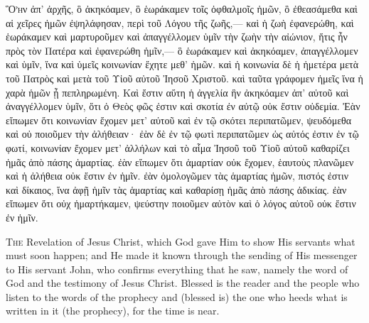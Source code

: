 \begin{pages}
    \begin{Rightside}
        \beginnumbering
		\renewcommand{\LettrineFontHook}{\PHtitl}
		\lettrine[lines=3]{Ὃ} ἦν ἀπ’ ἀρχῆς, ὃ ἀκηκόαμεν, ὃ ἑωράκαμεν τοῖς ὀφθαλμοῖς ἡμῶν, ὃ ἐθεασάμεθα καὶ αἱ χεῖρες ἡμῶν ἐψηλάφησαν, περὶ τοῦ Λόγου τῆς ζωῆς,— καὶ ἡ ζωὴ ἐφανερώθη, καὶ ἑωράκαμεν καὶ μαρτυροῦμεν καὶ ἀπαγγέλλομεν ὑμῖν τὴν ζωὴν τὴν αἰώνιον, ἥτις ἦν πρὸς τὸν Πατέρα καὶ ἐφανερώθη ἡμῖν,— ὃ ἑωράκαμεν καὶ ἀκηκόαμεν, ἀπαγγέλλομεν καὶ ὑμῖν, ἵνα καὶ ὑμεῖς κοινωνίαν ἔχητε μεθ’ ἡμῶν. καὶ ἡ κοινωνία δὲ ἡ ἡμετέρα μετὰ τοῦ Πατρὸς καὶ μετὰ τοῦ Υἱοῦ αὐτοῦ Ἰησοῦ Χριστοῦ. καὶ ταῦτα γράφομεν ἡμεῖς ἵνα ἡ χαρὰ ἡμῶν ᾖ πεπληρωμένη.
		\pend
		\pstart
		Καὶ ἔστιν αὕτη ἡ ἀγγελία ἣν ἀκηκόαμεν ἀπ’ αὐτοῦ καὶ ἀναγγέλλομεν ὑμῖν, ὅτι ὁ Θεὸς φῶς ἐστιν καὶ σκοτία ἐν αὐτῷ οὐκ ἔστιν οὐδεμία. Ἐὰν εἴπωμεν ὅτι κοινωνίαν ἔχομεν μετ’ αὐτοῦ καὶ ἐν τῷ σκότει περιπατῶμεν, ψευδόμεθα καὶ οὐ ποιοῦμεν τὴν ἀλήθειαν· ἐὰν δὲ ἐν τῷ φωτὶ περιπατῶμεν ὡς αὐτός ἐστιν ἐν τῷ φωτί, κοινωνίαν ἔχομεν μετ’ ἀλλήλων καὶ τὸ αἷμα Ἰησοῦ τοῦ Υἱοῦ αὐτοῦ καθαρίζει ἡμᾶς ἀπὸ πάσης ἁμαρτίας. ἐὰν εἴπωμεν ὅτι ἁμαρτίαν οὐκ ἔχομεν, ἑαυτοὺς πλανῶμεν καὶ ἡ ἀλήθεια οὐκ ἔστιν ἐν ἡμῖν. ἐὰν ὁμολογῶμεν τὰς ἁμαρτίας ἡμῶν, πιστός ἐστιν καὶ δίκαιος, ἵνα ἀφῇ ἡμῖν τὰς ἁμαρτίας καὶ καθαρίσῃ ἡμᾶς ἀπὸ πάσης ἀδικίας. ἐὰν εἴπωμεν ὅτι οὐχ ἡμαρτήκαμεν, ψεύστην ποιοῦμεν αὐτὸν καὶ ὁ λόγος αὐτοῦ οὐκ ἔστιν ἐν ἡμῖν.
		\pend
        \endnumbering
    \end{Rightside}
    \begin{Leftside}
        \beginnumbering
        	\renewcommand\LettrineFontHook{\Zallmanfamily}
		\lettrine[lines=3]{T}{he} Revelation of Jesus Christ, which God gave Him to show His servants what must soon happen; and He made it known through the sending of His messenger to His servant John, who confirms everything that he saw, namely the word of God and the testimony of Jesus Christ. Blessed is the reader and the people who listen to the words of the prophecy and (blessed is) the one who heeds what is written in it (the prophecy), for the time is near.
		\pend
        \endnumbering
    \end{Leftside}

\end{pages} 
\Pages

